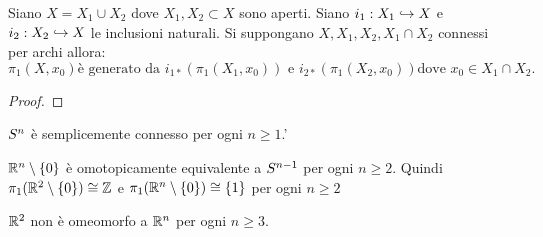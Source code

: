 \documentclass[]{article}
\begin{document}
\begin{theorem}  \nl
    Siano $X = X_1 \cup X_2$ dove $X_1, X_2 \subset X$ sono aperti. Siano $i_1: X_1 \hookrightarrow X$ e $i_2: X_2 \hookrightarrow X$ le inclusioni naturali. \nl
    Si suppongano $X, X_1, X_2, X_1 \cap X_2$ connessi per archi allora:
    \[
        \pi_1(X, x_0) \text{\`e generato da } i_{1*}\left(\pi_1\left(X_1, x_0\right)\right) \text{ e } i_{2*}\left(\pi_1\left(X_2, x_0\right)\right) \text{dove } x_0 \in X_1 \cap X_2.
    \]
\end{theorem}

\begin{proof}

\end{proof}

\begin{corollary} \nl
    $S^{n}$ \`e semplicemente connesso per ogni $n \geq 1$.'
\end{corollary}

\begin{corollary} \nl
    $\mathbb{R}^n \setminus \left\{ 0 \right\}$ \`e omotopicamente equivalente a $S^{n-1}$ per ogni $n \geq 2$. \nl
    Quindi $\pi_1(\mathbb{R}^2 \setminus \left\{ 0 \right\}) \cong \mathbb{Z}$ e $\pi_1(\mathbb{R}^n \setminus \left\{ 0 \right\}) \cong \left\{ 1 \right\}$ per ogni $n \geq 2$
\end{corollary}

\begin{corollary} \nl
    $\mathbb{R}^2$ non \`e omeomorfo a $\mathbb{R}^n$ per ogni $n \geq 3$.
\end{corollary}
\end{document}
